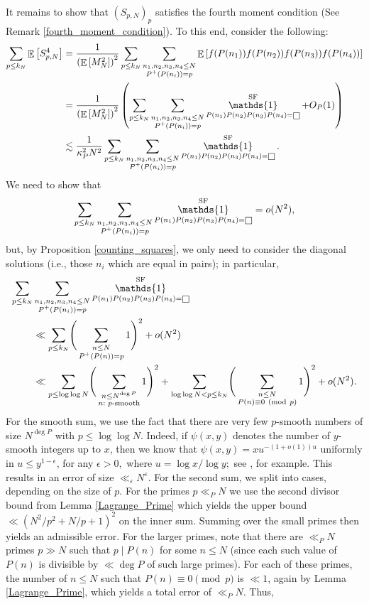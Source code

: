 \documentclass[11pts]{amsart}
\numberwithin{equation}{section}
\DeclareMathOperator{\E}{\mathbb{E}}
\DeclareMathOperator{\one}{\mathds{1}}
\let\oldsquare\square
\renewcommand{\square}[1][-1pt]{%
 {\raisebox{#1}{$\oldsquare$}}%
}
\newcommand{\Mod}[1]{\ (\text{mod}\ #1)}
\begin{document}
It remains to show that $(S_{p,N})_p$ satisfies the fourth moment condition (See Remark \ref{fourth_moment_condition}). To this end, consider the following:
\begin{align*}
    \sum_{p\leq k_N}\E\left[S_{p,N}^4\right]
    &=
    \frac{1}{\left(\E\left[M_N^2\right]\right)^2}\sum_{p\leq k_N}\sum_{\substack{{n_1,n_2,n_3,n_4\leq N}\\{P^+(P(n_i))=p}}}\E\left[f(P(n_1))f(P(n_2))f(P(n_3))f(P(n_4))\right]\\
    &=
    \frac{1}{\left(\E\left[M_N^2\right]\right)^2}\left(\sum_{p\leq k_N}\sum_{\substack{{n_1,n_2,n_3,n_4\leq N}\\{P^+(P(n_i))=p}}}\one_{P(n_1)P(n_2)P(n_3)P(n_4)=\square}^{\text{SF}}+O_P(1)\right)\\
    &\lesssim
    \frac{1}{\kappa_P^2N^2}\sum_{p\leq k_N}\sum_{\substack{{n_1,n_2,n_3,n_4\leq N}\\{P^+(P(n_i))=p}}}\one_{P(n_1)P(n_2)P(n_3)P(n_4)=\square}^{\text{SF}}.  
\end{align*}
We need to show that
\[
\sum_{p\leq k_N}\sum_{\substack{{n_1,n_2,n_3,n_4\leq N}\\{P^+(P(n_i))=p}}}\one_{P(n_1)P(n_2)P(n_3)P(n_4)=\square}^{\text{SF}}
=
o(N^2),
\]
but, by Proposition \ref{counting_squares}, we only need to consider the diagonal solutions (i.e., those $n_i$ which are equal in pairs); in particular,
\begin{align*}
    \sum_{p\leq k_N}&\sum_{\substack{{n_1,n_2,n_3,n_4\leq N}\\{P^+(P(n_i))=p}}}\one_{P(n_1)P(n_2)P(n_3)P(n_4)=\square}^{\text{SF}}\\
    &\ll
    \sum_{p\leq k_N}\Biggr(\sum_{\substack{{n\leq N}\\{P^+(P(n))=p}}}1\Biggr)^2 + o(N^2)\\
    &\ll
    \sum_{p\leq \log \log N}\Biggr(\sum_{\substack{{n\leq N^{\deg P}}\\{n:\text{ $p$-smooth}}}}1\Biggr)^2
    +
    \sum_{\log \log N<p\leq k_N}\Biggr(\sum_{\substack{{n\leq N}\\{P(n)\equiv 0\Mod{p}}}}1\Biggr)^2
    +
    o(N^2).
\end{align*}
For the smooth sum, we use the fact that there are very few $p$-smooth numbers of size $N^{\deg P}$ with $p\leq\log\log N$. Indeed, if $\psi(x,y)$ denotes the number of $y$-smooth integers up to $x$, then we know that $\psi(x,y)=xu^{-(1+o(1))u}$ uniformly in $u\leq y^{1-\epsilon}$, for any $\epsilon>0,$ where $u=\log x / \log y;$ see \cite[Corollary 1.3]{HildTen}, for example. This results in an error of size $\ll_{\varepsilon} N^\varepsilon$. For the second sum, we split into cases, depending on the size of $p$. For the primes $p\ll_P N$ we use the second divisor bound from Lemma \ref{Lagrange_Prime} which yields the upper bound $\ll \left(N^2/p^2 + N/p +1\right)^2$ on the inner sum. Summing over the small primes then yields an admissible error. For the larger primes, note that there are $\ll_P N$ primes $p\gg N$ such that $p\mid P(n)$ for some $n\leq N$ (since each such value of $P(n)$ is divisible by $\ll\deg P$ of such large primes). For each of these primes, the number of $n\leq N$ such that $P(n)\equiv 0\pmod p$ is $\ll 1$, again by Lemma \ref{Lagrange_Prime}, which yields a total error of $\ll_P N$. Thus,
\end{document}

